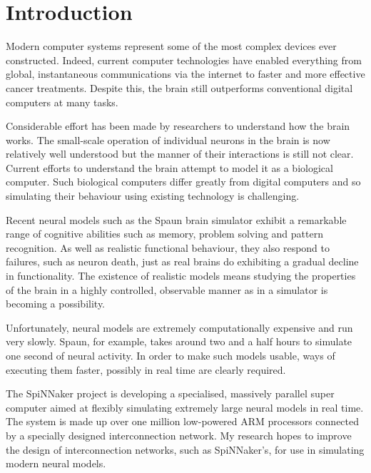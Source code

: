 \chapter{Introduction}
	
	
	Modern computer systems represent some of the most complex devices ever
	constructed. Indeed, current computer technologies have enabled everything
	from global, instantaneous communications via the internet to faster and more
	effective cancer treatments\cite{nassif}. Despite this, the brain still
	outperforms conventional digital computers at many tasks.
	
	Considerable effort has been made by researchers to understand how the brain
	works. The small-scale operation of individual neurons in the brain is now
	relatively well understood but the manner of their interactions is still not
	clear. Current efforts to understand the brain attempt to model it as a
	biological computer. Such biological computers differ greatly from digital
	computers and so simulating their behaviour using existing technology is
	challenging.
	
	Recent neural models such as the Spaun brain simulator \cite{eliasmith12}
	exhibit a remarkable range of cognitive abilities such as memory, problem
	solving and pattern recognition. As well as realistic functional behaviour,
	they also respond to failures, such as neuron death, just as real brains do
	exhibiting a gradual decline in functionality. The existence of realistic
	models means studying the properties of the brain in a highly controlled,
	observable manner as in a simulator is becoming a possibility.
	
	Unfortunately, neural models are extremely computationally expensive and run
	very slowly. Spaun, for example, takes around two and a half hours to simulate
	one second of neural activity. In order to make such models usable, ways of
	executing them faster, possibly in real time are clearly required.
	
	The SpiNNaker project is developing a specialised, massively parallel super
	computer aimed at flexibly simulating extremely large neural models in real
	time. The system is made up over one million low-powered ARM processors
	connected by a specially designed interconnection network. My research hopes
	to improve the design of interconnection networks, such as SpiNNaker's, for
	use in simulating modern neural models.
	
